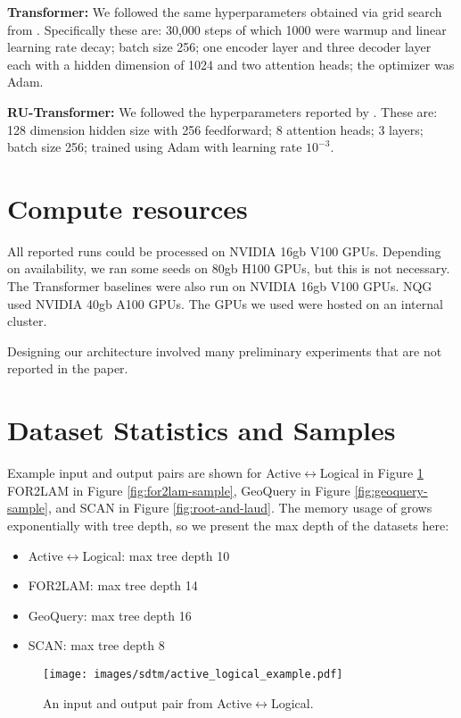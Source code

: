 \textbf{Transformer:} We followed the same hyperparameters obtained via grid search from \cite{Soulos_2023_DifferentiableTreeOperations}. Specifically these are: 30,000 steps of which 1000 were warmup and linear learning rate decay; batch size 256; one encoder layer and three decoder layer each with a hidden dimension of 1024 and two attention heads; the optimizer was Adam. 

\textbf{RU-Transformer:} We followed the hyperparameters reported by \cite{csordas-etal-2021-devil}. These are: 128 dimension hidden size with 256 feedforward; 8 attention heads; 3 layers; batch size 256; trained using Adam with learning rate $10^{-3}$. 

\section{Compute resources} \label{sec:sdtm-compute-resources}
All reported \sdtm runs could be processed on NVIDIA 16gb V100 GPUs. Depending on availability, we ran some seeds on 80gb H100 GPUs, but this is not necessary. The Transformer baselines were also run on NVIDIA 16gb V100 GPUs. NQG used NVIDIA 40gb A100 GPUs. The GPUs we used were hosted on an internal cluster. 

Designing our architecture involved many preliminary experiments that are not reported in the paper.

\section{Dataset Statistics and Samples} \label{sec:sdtm-data-stats-samples}
Example input and output pairs are shown for Active$\leftrightarrow$Logical in Figure \ref{fig:active-logical-sample}  FOR2LAM in Figure \ref{fig:for2lam-sample}, GeoQuery in Figure \ref{fig:geoquery-sample}, and SCAN in Figure \ref{fig:root-and-laud}. The memory usage of \dtm grows exponentially with tree depth, so we present the max depth of the datasets here:
\begin{itemize}
    \item Active$\leftrightarrow$Logical: max tree depth 10
    \item FOR2LAM: max tree depth 14
    \item GeoQuery: max tree depth 16
    \item SCAN: max tree depth 8
\end{itemize}


\begin{figure}
    \centering
    \texttt{[image: images/sdtm/active\_logical\_example.pdf]}
    \caption{An input and output pair from Active$\leftrightarrow$Logical. }
    \label{fig:active-logical-sample}
\end{figure}

